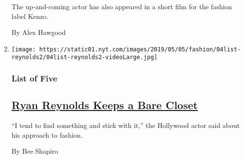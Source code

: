 \begin{enumerate}
  The up-and-coming actor has also appeared in a short film for the
  fashion label Kenzo.

  By Alex Hawgood
\item
  \texttt{[image: https://static01.nyt.com/images/2019/05/05/fashion/04list-reynolds2/04list-reynolds2-videoLarge.jpg]}

  \hypertarget{list-of-five}{%
  \subsubsection{List of Five}\label{list-of-five}}

  \hypertarget{ryan-reynolds-keeps-a-bare-closet}{%
  \subsection{\texorpdfstring{\href{/2019/05/03/fashion/mens-style/ryan-reynolds-blake-lively.html}{Ryan
  Reynolds Keeps a Bare
  Closet}}{Ryan Reynolds Keeps a Bare Closet}}\label{ryan-reynolds-keeps-a-bare-closet}}

  ``I tend to find something and stick with it,'' the Hollywood actor
  said about his approach to fashion.

  By Bee Shapiro
\end{enumerate}

